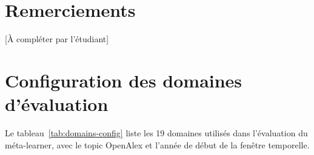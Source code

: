 \documentclass[12pt,a4paper,twoside]{report}
\begin{document}
\chapter*{Remerciements}

[À compléter par l'étudiant]

\tableofcontents
\listoffigures
\listoftables









\printbibliography[heading=bibintoc, title={Références bibliographiques}]

\appendix
\chapter{Configuration des domaines d'évaluation}
\label{app:domains}

Le tableau~\ref{tab:domains-config} liste les 19 domaines utilisés dans l'évaluation
du méta-learner, avec le topic OpenAlex et l'année de début de la fenêtre temporelle.
\end{document}
